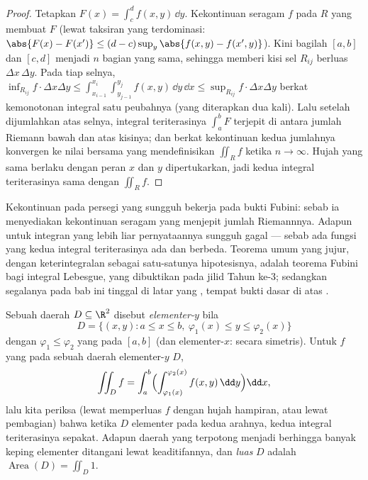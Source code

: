 \begin{proof}
Tetapkan $F(x) = \int_c^d f(x, y)\,\dd y$. Kekontinuan seragam $f$ pada
$R$ yang  membuat $F$  (lewat taksiran yang terdominasi:
$\abs{F(x) - F(x')} \leq (d - c)\sup_y\abs{f(x,y) - f(x',y)}$).
Kini bagilah $[a,b]$ dan $[c,d]$ menjadi $n$ bagian yang sama, sehingga memberi
kisi sel $R_{ij}$ berluas $\Delta x\,\Delta y$. Pada tiap selnya,
$\inf_{R_{ij}} f \cdot \Delta x \Delta y \leq
\int_{x_{i-1}}^{x_i}\int_{y_{j-1}}^{y_j} f(x,y)\,\dd y\,\dd x \leq
\sup_{R_{ij}} f \cdot \Delta x \Delta y$ berkat kemonotonan
integral satu peubahnya (yang diterapkan dua kali). Lalu setelah dijumlahkan atas selnya,
integral teriterasinya $\int_a^b F$ terjepit di antara jumlah Riemann bawah dan
atas kisinya; dan berkat kekontinuan  kedua jumlahnya
konvergen ke nilai bersama yang mendefinisikan $\iint_R f$ ketika $n \to
\infty$. Hujah yang sama berlaku dengan peran $x$ dan $y$
dipertukarkan, jadi kedua integral teriterasinya sama dengan $\iint_R f$.
\end{proof}

\begin{remark}
Kekontinuan pada persegi  yang  sungguh bekerja pada
bukti Fubini: sebab ia menyediakan kekontinuan seragam yang
menjepit jumlah Riemannnya. Adapun untuk integran yang lebih liar
pernyataannya sungguh gagal --- sebab ada fungsi yang kedua
integral teriterasinya ada dan berbeda. Teorema umum yang
jujur, dengan keterintegralan sebagai satu-satunya hipotesisnya, adalah
teorema Fubini bagi integral Lebesgue, yang dibuktikan pada
jilid Tahun ke-3; sedangkan segalanya pada bab ini tinggal di latar
yang , tempat bukti dasar di atas
.
\end{remark}

\begin{definition}\label{def:b2:multint:domain}
Sebuah daerah $D \subseteq \R^2$ disebut \emph{elementer-$y$} bila
\[
D = \{(x, y) : a \leq x \leq b,\
\varphi_1(x) \leq y \leq \varphi_2(x)\}
\]
dengan $\varphi_1 \leq \varphi_2$ yang  pada $[a,b]$
(dan elementer-$x$: secara simetris). Untuk $f$ yang \omterm{def:b2:metric:continuity}{kontinu} pada
sebuah daerah elementer-$y$ $D$,
\[
\iint_D f
= \int_a^b\Bigl(
\int_{\varphi_1(x)}^{\varphi_2(x)} f(x,y)\,\dd y\Bigr)\dd x ,
\]
lalu kita periksa (lewat memperluas $f$ dengan hujah hampiran, atau
lewat pembagian) bahwa ketika $D$ elementer pada kedua arahnya, kedua
integral teriterasinya sepakat. Adapun daerah yang terpotong menjadi berhingga banyak
keping elementer ditangani lewat keaditifannya, dan
\emph{luas} $D$ adalah $\operatorname
{Area}(D) = \iint_D 1$.
\end{definition}

